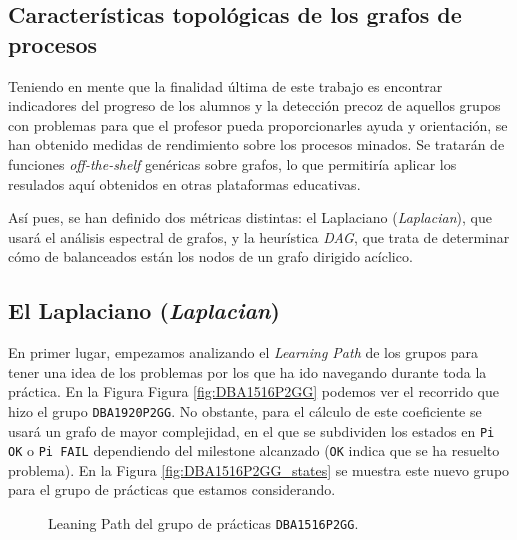 \subsection{Características topológicas de los grafos de procesos}

Teniendo en mente que la finalidad última de este trabajo es encontrar indicadores del progreso de los alumnos y la detección precoz de aquellos grupos con problemas para que el profesor pueda proporcionarles ayuda y orientación, se han obtenido medidas de rendimiento sobre los procesos minados. Se tratarán de funciones \emph{off-the-shelf} genéricas sobre grafos, lo que permitiría aplicar los resulados aquí obtenidos en otras plataformas educativas.

Así pues, se han definido dos métricas distintas: el Laplaciano (\emph{Laplacian}), que usará el análisis espectral de grafos, y la heurística \emph{DAG}, que trata de determinar cómo de balanceados están los nodos de un grafo dirigido acíclico.

\subsection{El Laplaciano (\emph{Laplacian})}

En primer lugar, empezamos analizando el \emph{Learning Path} de los grupos para tener una idea de los problemas por los que ha ido navegando durante toda la práctica. En la Figura Figura \ref{fig:DBA1516P2GG} podemos ver el recorrido que hizo el grupo \texttt{DBA1920P2GG}. No obstante, para el cálculo de este coeficiente se usará un grafo de mayor complejidad, en el que se subdividen los estados en \texttt{Pi OK} o \texttt{Pi FAIL} dependiendo del milestone alcanzado (\texttt{OK} indica que se ha resuelto problema). En la Figura \ref{fig:DBA1516P2GG_states} se muestra este nuevo grupo para el grupo de prácticas que estamos considerando.

\begin{figure}[H]
\centering
{}\qquad
{}
\caption{Leaning Path del grupo de prácticas \texttt{DBA1516P2GG}.}
\label{fig:laplacian}
\end{figure}

